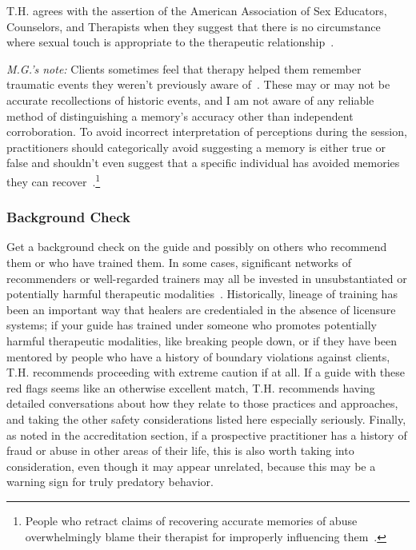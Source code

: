 \documentclass[11pt,oneside]{book}
\let\cite\parencite
\begin{document}
T.H. agrees with the assertion of the American Association of Sex Educators, Counselors, and Therapists when they suggest that there is no circumstance where sexual touch is appropriate to the therapeutic relationship~\cite{aasectTouch}.

\textit{M.G.'s note:} Clients sometimes feel that therapy helped them remember traumatic events they weren't previously aware of~\cite{psychedelicrecoveredmemory}. These may or may not be accurate recollections of historic events, and I am not aware of any reliable method of distinguishing a memory's accuracy other than independent corroboration. To avoid incorrect interpretation of perceptions during the session, practitioners should categorically avoid suggesting a memory is either true or false and shouldn't even suggest that a specific individual has avoided memories they can recover~\cite{otgaarMemory}.\footnote{People who retract claims of recovering accurate memories of abuse overwhelmingly blame their therapist for improperly influencing them~\cite{otgaarMemory}.}

\subsubsection*{Background Check}
Get a background check on the guide and possibly on others who recommend them or who have trained them. In some cases, significant networks of recommenders or well-regarded trainers may all be invested in unsubstantiated or potentially harmful therapeutic modalities~\cite{hallMad}. Historically, lineage of training has been an important way that healers are credentialed in the absence of licensure systems; if your guide has trained under someone who promotes potentially harmful therapeutic modalities, like breaking people down, or if they have been mentored by people who have a history of boundary violations against clients, T.H. recommends proceeding with extreme caution if at all. If a guide with these red flags seems like an otherwise excellent match, T.H. recommends having detailed conversations about how they relate to those practices and approaches, and taking the other safety considerations listed here especially seriously. Finally, as noted in the accreditation section, if a prospective practitioner has a history of fraud or abuse in other areas of their life, this is also worth taking into consideration, even though it may appear unrelated, because this may be a warning sign for truly predatory behavior. 
\end{document}
